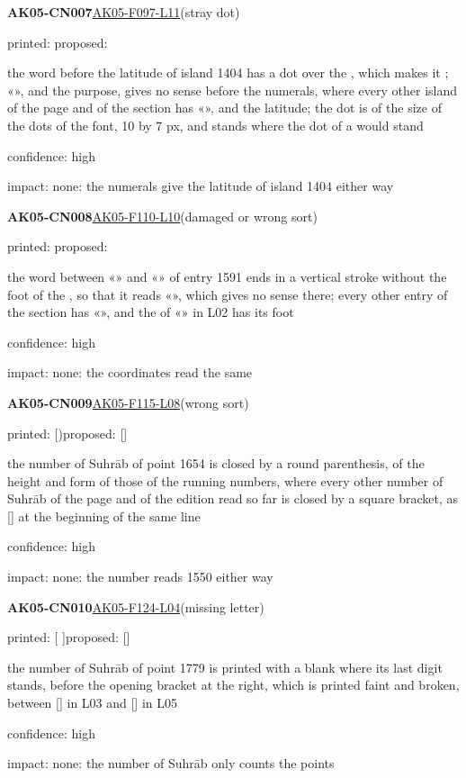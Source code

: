 \documentclass[11pt]{article}
\begin{document}
\noindent\textbf{AK05-CN007}\enspace\hyperlink{AK05-F097-L11}{AK05-F097-L11}\enspace(stray dot)\par\noindent printed: \enspace proposed: \par\noindent the word before the latitude of island 1404 has a dot over the , which makes it ; «», and the purpose, gives no sense before the numerals, where every other island of the page and of the section has «», and the latitude; the dot is of the size of the dots of the font, 10 by 7 px, and stands where the dot of a  would stand\par\noindent confidence: high\par\noindent impact: none: the numerals give the latitude of island 1404 either way\par\medskip
\noindent\textbf{AK05-CN008}\enspace\hyperlink{AK05-F110-L10}{AK05-F110-L10}\enspace(damaged or wrong sort)\par\noindent printed: \enspace proposed: \par\noindent the word between «» and «» of entry 1591 ends in a vertical stroke without the foot of the , so that it reads «», which gives no sense there; every other entry of the section has «», and the  of «» in L02 has its foot\par\noindent confidence: high\par\noindent impact: none: the coordinates read the same\par\medskip
\noindent\textbf{AK05-CN009}\enspace\hyperlink{AK05-F115-L08}{AK05-F115-L08}\enspace(wrong sort)\par\noindent printed: [)\enspace proposed: []\par\noindent the number of Suhrāb of point 1654 is closed by a round parenthesis, of the height and form of those of the running numbers, where every other number of Suhrāb of the page and of the edition read so far is closed by a square bracket, as [] at the beginning of the same line\par\noindent confidence: high\par\noindent impact: none: the number reads 1550 either way\par\medskip
\noindent\textbf{AK05-CN010}\enspace\hyperlink{AK05-F124-L04}{AK05-F124-L04}\enspace(missing letter)\par\noindent printed: [ ]\enspace proposed: []\par\noindent the number of Suhrāb of point 1779 is printed with a blank where its last digit stands, before the opening bracket at the right, which is printed faint and broken, between [] in L03 and [] in L05\par\noindent confidence: high\par\noindent impact: none: the number of Suhrāb only counts the points\par\medskip
\end{document}
